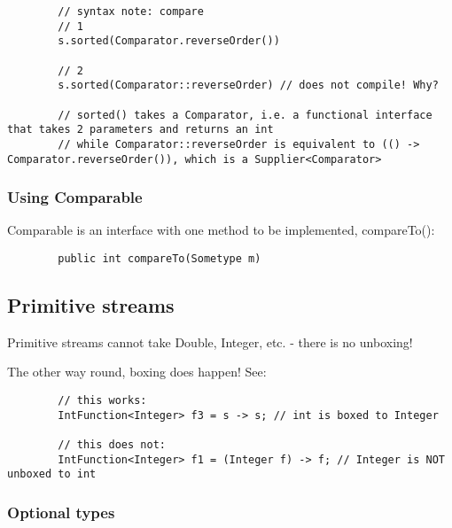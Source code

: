 \documentclass{scrartcl}
\begin{document}
    \begin{lstlisting}
    \end{lstlisting}


    \begin{lstlisting}
    \end{lstlisting}


    \begin{lstlisting}
    \end{lstlisting}

    \begin{lstlisting}
        // syntax note: compare
        // 1
        s.sorted(Comparator.reverseOrder())

        // 2
        s.sorted(Comparator::reverseOrder) // does not compile! Why?

        // sorted() takes a Comparator, i.e. a functional interface that takes 2 parameters and returns an int
        // while Comparator::reverseOrder is equivalent to (() -> Comparator.reverseOrder()), which is a Supplier<Comparator>
    \end{lstlisting}

\subsubsection{Using Comparable}

    Comparable is an interface with one method to be implemented, compareTo():

    \begin{lstlisting}
        public int compareTo(Sometype m)
    \end{lstlisting}

\subsection{Primitive streams}

    Primitive streams cannot take Double, Integer, etc. - there is no unboxing!

    The other way round, boxing does happen! See:

    \begin{lstlisting}
        // this works:
        IntFunction<Integer> f3 = s -> s; // int is boxed to Integer

        // this does not:
        IntFunction<Integer> f1 = (Integer f) -> f; // Integer is NOT unboxed to int
    \end{lstlisting}

\subsubsection{Optional types}
\end{document}
